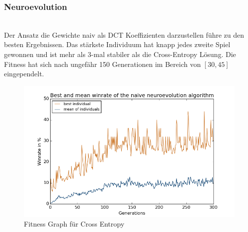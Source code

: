             \subsubsection*{Neuroevolution}
                \begin{multicols}{2}
                    \noindent
                    \\[5mm]
                    Der Ansatz die Gewichte naiv als DCT Koeffizienten darzustellen führe zu den besten Ergebnissen. Das stärkste Individuum hat knapp jedes zweite Spiel gewonnen und ist mehr als 3-mal stabiler als die Cross-Entropy Lösung. Die Fitness hat sich nach ungefähr 150 Generationen im Bereich von $[30,45]$ eingependelt.
                    \begin{figure}[H]
                       \includegraphics[scale=0.5]{../pictures/summary/neural-fitness.png}
                       \caption{Fitness Graph für Cross Entropy}\label{fig:graph-ne}
                    \end{figure}
                \end{multicols}

